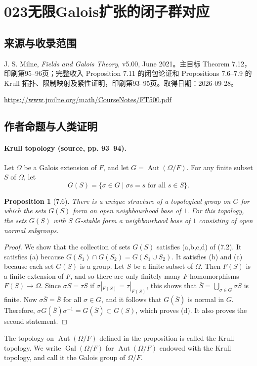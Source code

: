 \documentclass[UTF8,11pt]{ctexart}
\newtheorem*{proposition}{Proposition}
\theoremstyle{definition}
\begin{document}
\section*{023\quad 无限Galois扩张的闭子群对应}
\subsection*{来源与收录范围}
J. S. Milne, \emph{Fields and Galois Theory}, v5.00, June 2021。主目标 Theorem 7.12，印刷第95--96页；完整收入 Proposition 7.11 的闭包论证和 Propositions 7.6--7.9 的 Krull 拓扑、限制映射及紧性证明，印刷第93--95页。取得日期：2026-09-28。
\par\url{https://www.jmilne.org/math/CourseNotes/FT500.pdf}
\subsection*{作者命题与人类证明}
\paragraph{Krull topology (source, pp. 93--94).}
Let $\Omega$ be a Galois extension of $F$, and let $G=\operatorname{Aut}(\Omega/F)$. For any finite subset $S$ of $\Omega$, let
\[
G(S)=\{\sigma\in G\mid \sigma s=s\text{ for all }s\in S\}.
\]
\begin{proposition}[7.6]
There is a unique structure of a topological group on $G$ for which the sets $G(S)$ form an open neighbourhood base of $1$. For this topology, the sets $G(S)$ with $S$ $G$-stable form a neighbourhood base of $1$ consisting of open normal subgroups.
\end{proposition}
\begin{proof}
We show that the collection of sets $G(S)$ satisfies (a,b,c,d) of (7.2). It satisfies (a) because $G(S_1)\cap G(S_2)=G(S_1\cup S_2)$. It satisfies (b) and (c) because each set $G(S)$ is a group. Let $S$ be a finite subset of $\Omega$. Then $F(S)$ is a finite extension of $F$, and so there are only finitely many $F$-homomorphisms $F(S)\to\Omega$. Since $\sigma S=\tau S$ if $\sigma|_{F(S)}=\tau|_{F(S)}$, this shows that $\overline S=\bigcup_{\sigma\in G}\sigma S$ is finite. Now $\sigma\overline S=\overline S$ for all $\sigma\in G$, and it follows that $G(\overline S)$ is normal in $G$. Therefore, $\sigma G(\overline S)\sigma^{-1}=G(\overline S)\subset G(S)$, which proves (d). It also proves the second statement.
\end{proof}
The topology on $\operatorname{Aut}(\Omega/F)$ defined in the proposition is called the Krull topology. We write $\operatorname{Gal}(\Omega/F)$ for $\operatorname{Aut}(\Omega/F)$ endowed with the Krull topology, and call it the Galois group of $\Omega/F$.
\end{document}
